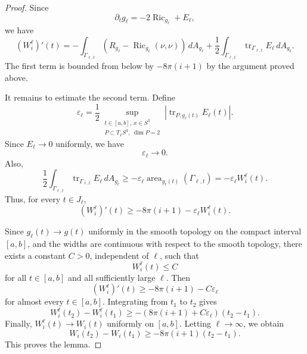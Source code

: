 \documentclass[12pt,english]{amsart}
\theoremstyle{definition}
\begin{document}
\begin{proof}
Since
\[
\partial_t g_\ell
=
-2\operatorname{Ric}_{g_\ell}+E_\ell,
\]
we have
\[
(W_i^\ell)'(t)
=
-\int_{\Gamma_{\ell,t}}
\left(R_{g_\ell}-\operatorname{Ric}_{g_\ell}(\nu,\nu)\right)\,dA_{g_\ell}
+
\frac12
\int_{\Gamma_{\ell,t}}
\operatorname{tr}_{\Gamma_{\ell,t}}E_\ell\,dA_{g_\ell}.
\]
The first term is bounded from below by \(-8\pi(i+1)\) by the argument proved above.

It remains to estimate the second term. Define
\[
\varepsilon_\ell
=
\frac12
\sup_{\substack{t\in[a,b],\,x\in S^3\\
P\subset T_xS^3,\ \dim P=2}}
\left|
\operatorname{tr}_{P,g_\ell(t)} E_\ell(t)
\right|.
\]
Since \(E_\ell\to0\) uniformly, we have
\[
\varepsilon_\ell\to0.
\]
Also,
\[
\frac12
\int_{\Gamma_{\ell,t}}
\operatorname{tr}_{\Gamma_{\ell,t}}E_\ell\,dA_{g_\ell}
\ge
-\varepsilon_\ell
\operatorname{area}_{g_\ell(t)}(\Gamma_{\ell,t})
=
-\varepsilon_\ell W_i^\ell(t).
\]
Thus, for every \(t\in J_\ell\),
\[
(W_i^\ell)'(t)
\ge
-8\pi(i+1)-\varepsilon_\ell W_i^\ell(t).
\]

Since \(g_\ell(t)\to g(t)\) uniformly in the smooth topology on the compact interval \([a,b]\), and the widths are continuous with respect to the smooth topology, there exists a constant \(C>0\), independent of \(\ell\), such that
\[
W_i^\ell(t)\le C
\]
for all \(t\in[a,b]\) and all sufficiently large \(\ell\). Then
\[
(W_i^\ell)'(t)
\ge
-8\pi(i+1)-C\varepsilon_\ell
\]
for almost every \(t\in[a,b]\). Integrating from \(t_1\) to \(t_2\) gives
\[
W_i^\ell(t_2)-W_i^\ell(t_1)
\ge
-\left(8\pi(i+1)+C\varepsilon_\ell\right)(t_2-t_1).
\]
Finally, \(W_i^\ell(t)\to W_i(t)\) uniformly on \([a,b]\). Letting
\(\ell\to\infty\), we obtain
\[
W_i(t_2)-W_i(t_1)
\ge
-8\pi(i+1)(t_2-t_1).
\]
This proves the lemma.
\end{proof}
\end{document}
